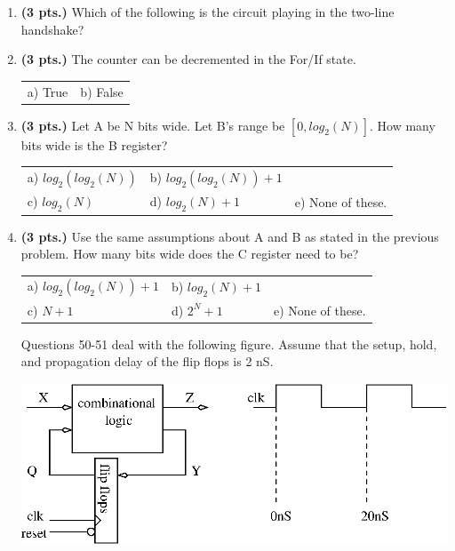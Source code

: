 \documentclass{article}
\begin{document}
\begin{enumerate}
\item{\bf (3 pts.)} Which of the following is the circuit playing in the
two-line handshake?

\item{\bf (3 pts.)} The counter can be decremented in the For/If state.

\begin{tabular}{p{1.75in}p{1.75in}}
a) True  & b) False \\
\end{tabular}

\item {\bf (3 pts.)} Let A be N bits wide.  Let B's range be $[0,log_2(N)]$.
How many bits wide is the B register?

\begin{tabular}{p{1.30in}p{1.30in}p{2.00in}}
a) $log_2(log_2(N))$ & b) $log_2(log_2(N))+1$ &   \\
c) $log_2(N)$ & d) $log_2(N)+1$ & e) None of these.\\
\end{tabular}

\item {\bf (3 pts.)} Use the same assumptions about A and B as stated in the previous
problem.  How many bits wide does the C register need to be?

\begin{tabular}{p{1.30in}p{1.3in}p{2.00in}}
a) $log_2(log_2(N))+1$ & b) $log_2(N)+1$ &   \\
c) $N+1$ & d) $2^N+1$ & e) None of these.\\
\end{tabular}
\vspace{5mm}

\pagebreak
Questions 50-51 deal with the following figure.  Assume that the
setup, hold, and propagation delay of the flip flops is 2 nS.

\includegraphics{./Fig3/fsm.eps}


\end{enumerate}
\end{document}
